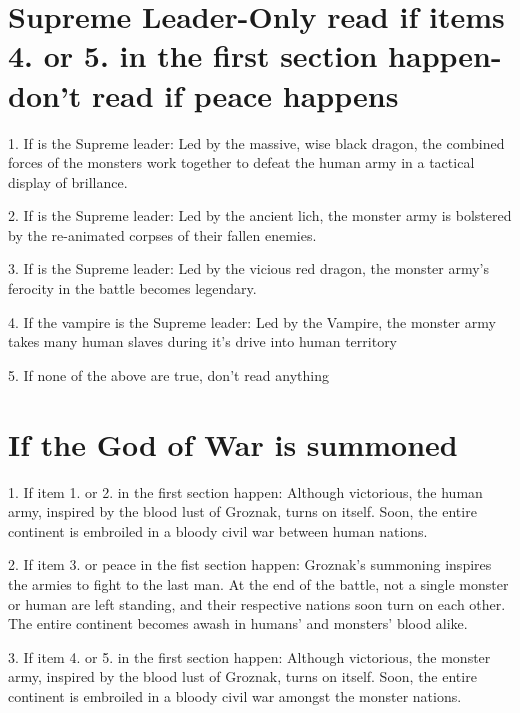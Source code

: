 \documentclass[green]{guildcamp2}
\begin{document}
\section {Supreme Leader-Only read if items 4. or 5. in the first section happen-don't read if peace happens}
\begin{enum}
	\item 1. If \cOnyx{} is the Supreme leader: Led by the massive, wise black dragon, the combined forces of the monsters work together to defeat the human army in a tactical display of brillance.
	\item 2. If \cLich{} is the Supreme leader: Led by the ancient lich, the monster army is bolstered by the re-animated corpses of their fallen enemies.
	\item 3. If \cRed{} is the Supreme leader: Led by the vicious red dragon, the monster army's ferocity in the battle becomes legendary.
	\item 4. If the vampire is the Supreme leader: Led by the Vampire, the monster army takes many human slaves during it's drive into human territory
	\item 5. If none of the above are true, don't read anything
	\end{enum}
\section {If the God of War is summoned}
	\begin{enum}
		\item 1. If item 1. or 2. in the first section happen: Although victorious, the human army, inspired by the blood lust of Groznak, turns on itself. Soon, the entire continent is embroiled in a bloody civil war between human nations.
		\item 2. If item 3. or peace in the fist section happen: Groznak's summoning inspires the armies to fight to the last man. At the end of the battle, not a single monster or human are left standing, and their respective nations soon turn on each other. The entire continent becomes awash in humans' and monsters' blood alike.
		\item 3. If item 4. or 5. in the first section happen: Although victorious, the monster army, inspired by the blood lust of Groznak, turns on itself. Soon, the entire continent is embroiled in a bloody civil war amongst the monster nations.
		\end{enum}
\end{document}
